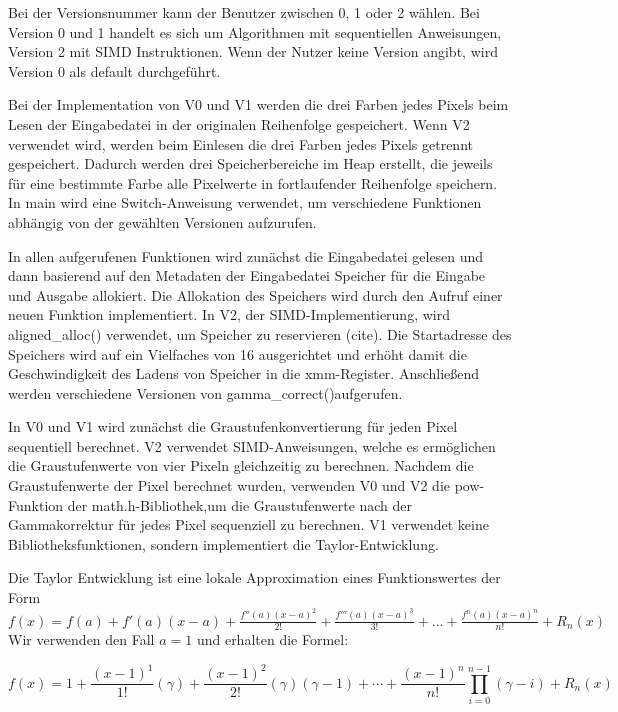 \documentclass[course=erap]{aspdoc}
\begin{document}
\par
Bei der Versionsnummer kann der Benutzer zwischen 0, 1 oder 2 wählen. Bei Version 0 und 1 handelt es sich um Algorithmen mit  sequentiellen Anweisungen, Version 2 mit SIMD Instruktionen. Wenn der Nutzer keine Version angibt, wird Version 0 als default durchgeführt.

\par
Bei der Implementation von V0 und V1 werden die drei Farben jedes Pixels beim Lesen der Eingabedatei in der originalen Reihenfolge gespeichert. Wenn V2 verwendet wird, werden beim Einlesen die drei Farben jedes Pixels getrennt gespeichert. Dadurch werden drei Speicherbereiche im Heap erstellt, die jeweils für eine bestimmte Farbe alle Pixelwerte in fortlaufender Reihenfolge speichern. In main wird eine Switch-Anweisung verwendet, um verschiedene Funktionen abhängig von der gewählten Versionen aufzurufen. 

\par
In allen aufgerufenen Funktionen wird zunächst die Eingabedatei gelesen und dann basierend auf den Metadaten der Eingabedatei Speicher für die Eingabe und Ausgabe allokiert. Die Allokation des Speichers wird durch den Aufruf einer neuen Funktion implementiert. In V2, der SIMD-Implementierung, wird aligned\_alloc() verwendet, um Speicher zu reservieren (cite). Die Startadresse des Speichers wird auf ein Vielfaches von 16 ausgerichtet und erhöht damit die Geschwindigkeit des Ladens von Speicher in die xmm-Register. Anschließend werden verschiedene Versionen von gamma\_correct()aufgerufen.

\par
In V0 und V1 wird zunächst die Graustufenkonvertierung für jeden Pixel sequentiell berechnet. V2 verwendet SIMD-Anweisungen, welche es ermöglichen die Graustufenwerte von vier Pixeln gleichzeitig zu berechnen. Nachdem die Graustufenwerte der Pixel berechnet wurden, verwenden V0 und V2 die pow-Funktion der math.h-Bibliothek,um die Graustufenwerte nach der Gammakorrektur für jedes Pixel sequenziell zu berechnen. V1 verwendet keine Bibliotheksfunktionen, sondern implementiert die Taylor-Entwicklung.

\par
Die Taylor Entwicklung ist eine lokale Approximation eines Funktionswertes der Form $f(x) = f(a) + f'(a)(x-a) + \frac{{f''(a)(x-a)^2}}{2!} + \frac{{f'''(a)(x-a)^3}}{3!} + \ldots + \frac{{f^n(a)(x-a)^n}}{n!} + R_n(x) $ Wir verwenden den Fall $a=1$ und erhalten die Formel:

\begin{equation}
f(x) = 1 + \frac{(x-1)^1}{1!} (\gamma) + \frac{(x-1)^2}{2!} (\gamma)(\gamma-1)  + \cdots + \frac{(x-1)^n}{n!} \prod_{i=0}^{n-1} (\gamma-i) + R_n(x)
\end{equation}
\end{document}
